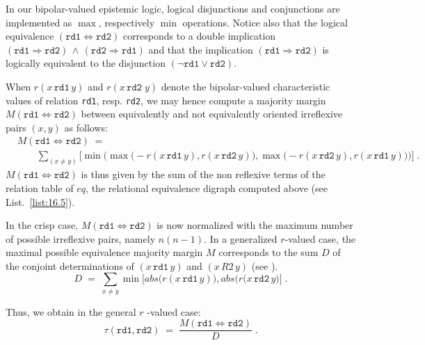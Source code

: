 In our bipolar-valued epistemic logic, logical disjunctions and conjunctions are implemented as $\max$, respectively $\min$ operations. Notice also that the logical equivalence $(\mathtt{rd1} \Leftrightarrow \mathtt{rd2})$ corresponds to a double implication $(\mathtt{rd1} \Rightarrow \mathtt{rd2})\, \wedge \, (\mathtt{rd2} \Rightarrow  \mathtt{rd1})$ and that the implication $(\mathtt{rd1} \Rightarrow \mathtt{rd2})$ is logically equivalent to the disjunction $(\neg \mathtt{rd1} \vee \mathtt{rd2})$.

When $r(x\,\mathtt{rd1}\, y)$ and $r(x\,\mathtt{rd2}\; y)$ denote the bipolar-valued characteristic values of relation \texttt{rd1}, resp. \texttt{rd2}, we may hence compute a majority margin $M(\mathtt{rd1} \Leftrightarrow \mathtt{rd2})$ between equivalently and not equivalently oriented irreflexive pairs $(x,y)$ as follows:
\begin{equation}\label{eq:16:2}
  \begin{split}
&M(\mathtt{rd1} \Leftrightarrow \mathtt{rd2}) \; =\\
&\quad \quad \sum_{(x \neq y)} \Big[ \min \Big( \max \big( -r(x \,\mathtt{rd1}\, y), r(x \,\mathtt{rd2}\, y)\big), \max \big( -r(x \,\mathtt{rd2}\, y), r(x \,\mathtt{rd1}\, y)\big) \Big) \Big]\;.
\end{split}
\end{equation}
$M(\mathtt{rd1} \Leftrightarrow \mathtt{rd2})$ is thus given by the sum of the non reflexive terms of the relation table of $eq$, the relational equivalence digraph computed above (see List.~\vref{list:16.5}).

In the crisp case, $M(\mathtt{rd1} \Leftrightarrow \mathtt{rd2})$  is now normalized with the maximum number of possible irreflexive pairs, namely $n(n-1)$. In a generalized $r$-valued case, the maximal possible equivalence majority margin $M$ corresponds to the sum $D$ of the conjoint determinations of $(x \,\mathtt{rd1}\, y)$ and $(x \,R2\, y)$ (see \citep{BIS-2012a}). 
\begin{equation}
  D \;=\; \sum_{x \neq y} \min \Big[ abs\big(r(x \,\mathtt{rd1}\, y) \big), abs \big( r(x \,\mathtt{rd2}\, y \big)  \Big]\;.
\end{equation}

Thus, we obtain in the general $r$ -valued case:
\begin{equation}
  \tau(\mathtt{rd1},\mathtt{rd2}) \;=\; \frac{M(\mathtt{rd1} \Leftrightarrow \mathtt{rd2})}{D}\;.
\end{equation}

